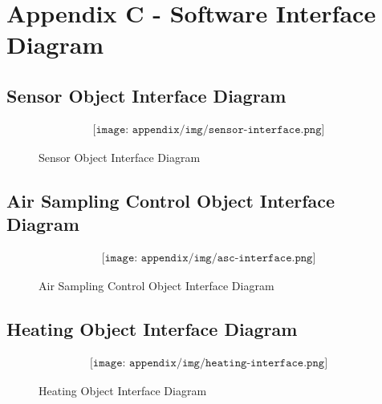 \section{Appendix C - Software Interface Diagram} \label{sec:appC}
\subsection{Sensor Object Interface Diagram} %
\begin{figure}[H]
    \begin{align*}
        \texttt{[image: appendix/img/sensor-interface.png]}
    \end{align*}
    \caption{Sensor Object Interface Diagram}
    \label{fig:C1}
\end{figure}


\subsection{Air Sampling Control Object Interface Diagram} %
\begin{figure}[H]
    \begin{align*}
        \texttt{[image: appendix/img/asc-interface.png]}
    \end{align*}
    \caption{Air Sampling Control Object Interface Diagram}
    \label{fig:C2}
\end{figure}


\subsection{Heating Object Interface Diagram} %
\begin{figure}[H]
    \begin{align*}
        \texttt{[image: appendix/img/heating-interface.png]}
    \end{align*}
    \caption{Heating Object Interface Diagram}
    \label{fig:C3}
\end{figure}